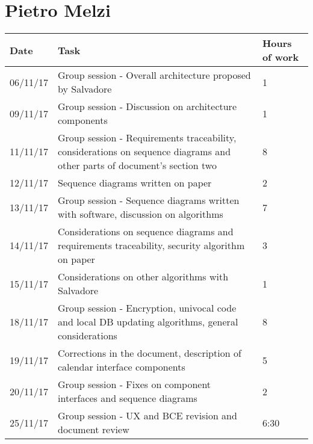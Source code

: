 \section{Pietro Melzi}
\begin{table}[H]
	\begin{tabular}{ p{2cm} p{10cm} p{3cm}}
	Date & Task & Hours of work\\
	\hline
	06/11/17 & Group session - Overall architecture proposed by Salvadore & 1 \\
	09/11/17 & Group session - Discussion on architecture components & 1 \\
	11/11/17 & Group session - Requirements traceability, considerations on sequence diagrams and other parts of document's section two & 8 \\
	12/11/17 & Sequence diagrams written on paper & 2 \\
	13/11/17 & Group session - Sequence diagrams written with software, discussion on algorithms & 7 \\
	14/11/17 & Considerations on sequence diagrams and requirements traceability, security algorithm on paper & 3 \\
	15/11/17 & Considerations on other algorithms with Salvadore & 1 \\
	18/11/17 & Group session - Encryption, univocal code and local DB updating algorithms, general considerations & 8 \\
	19/11/17 & Corrections in the document, description of calendar interface components & 5 \\
	20/11/17 & Group session - Fixes on component interfaces and sequence diagrams & 2 \\
	25/11/17 & Group session - UX and BCE revision and document review & 6:30 \\
	\end{tabular}
\end{table}

